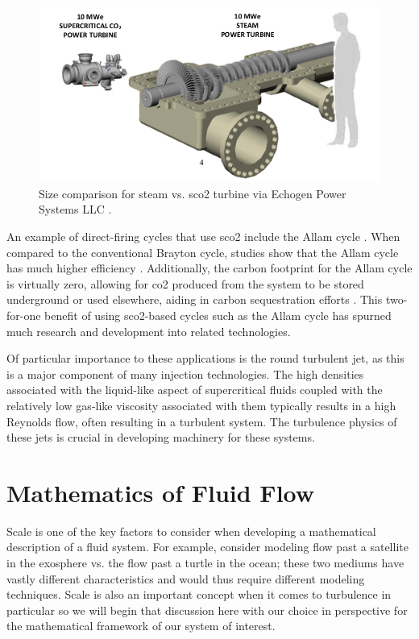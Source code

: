 \begin{figure}[h!]
\begin{center}
\includegraphics[scale=.5]{figures/steam_vs_sco2_turbine}
\end{center}
\caption{Size comparison for steam vs. \gls{sco2} turbine via Echogen Power Systems LLC \cite{commercialization}.}
\label{turbine_comp}
\end{figure}

An example of direct-firing cycles that use \gls{sco2} include the Allam cycle \cite{allam2013system}. When compared to the conventional Brayton cycle, studies show that the Allam cycle has much higher efficiency \cite{ALLAMCOMP, ALLAM20175948}. Additionally, the carbon footprint for the Allam cycle is virtually zero, allowing for \gls{co2} produced from the system to be stored underground or used elsewhere, aiding in carbon sequestration efforts \cite{cleantechnol1010022}. This two-for-one benefit of using \gls{sco2}-based cycles such as the Allam cycle has spurned much research \cite{ALLAMTech1, CHAN2021113972} and development \cite{8Rivers} into related technologies.

Of particular importance to these applications is the round turbulent jet, as this is a major component of many injection technologies. The high densities associated with the liquid-like aspect of supercritical fluids coupled with the relatively low gas-like viscosity associated with them typically results in a high Reynolds flow, often resulting in a turbulent system. The turbulence physics of these jets is crucial in developing machinery for these systems. 

\section{Mathematics of Fluid Flow}

Scale is one of the key factors to consider when developing a mathematical description of a fluid system. For example, consider modeling flow past a satellite in the exosphere vs. the flow past a turtle in the ocean; these two mediums have vastly different characteristics and would thus require different modeling techniques. Scale is also an important concept when it comes to turbulence in particular so we will begin that discussion here with our choice in perspective for the mathematical framework of our system of interest.

